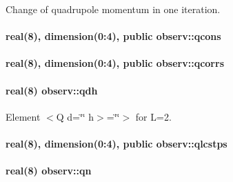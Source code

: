 Change of quadrupole momentum in one iteration. 

\paragraph[{\texorpdfstring{qcons}{qcons}}]{\setlength{\rightskip}{0pt plus 5cm}real(8), dimension(0\+:4), public observ\+::qcons}\hypertarget{namespaceobserv_aa5526a16e8f0982dec32b788e8c13eae}{}\label{namespaceobserv_aa5526a16e8f0982dec32b788e8c13eae}
\paragraph[{\texorpdfstring{qcorrs}{qcorrs}}]{\setlength{\rightskip}{0pt plus 5cm}real(8), dimension(0\+:4), public observ\+::qcorrs}\hypertarget{namespaceobserv_a16d0b249b06168c260b7a7752729f60a}{}\label{namespaceobserv_a16d0b249b06168c260b7a7752729f60a}
\paragraph[{\texorpdfstring{qdh}{qdh}}]{\setlength{\rightskip}{0pt plus 5cm}real(8) observ\+::qdh}\hypertarget{namespaceobserv_a5631c0f0849e2ae5860c899e3d8e39aa}{}\label{namespaceobserv_a5631c0f0849e2ae5860c899e3d8e39aa}


Element $<$\+Q d=\char`\"{}\char`\"{} h$>$=\char`\"{}\char`\"{}$>$ for L=2. 

\paragraph[{\texorpdfstring{qlcstps}{qlcstps}}]{\setlength{\rightskip}{0pt plus 5cm}real(8), dimension(0\+:4), public observ\+::qlcstps}\hypertarget{namespaceobserv_a6a9c12cdfb362e6d2af583d7eb17d32f}{}\label{namespaceobserv_a6a9c12cdfb362e6d2af583d7eb17d32f}
\paragraph[{\texorpdfstring{qn}{qn}}]{\setlength{\rightskip}{0pt plus 5cm}real(8) observ\+::qn}\hypertarget{namespaceobserv_af510c9ba2765c7af068833bc25758aa1}{}\label{namespaceobserv_af510c9ba2765c7af068833bc25758aa1}


